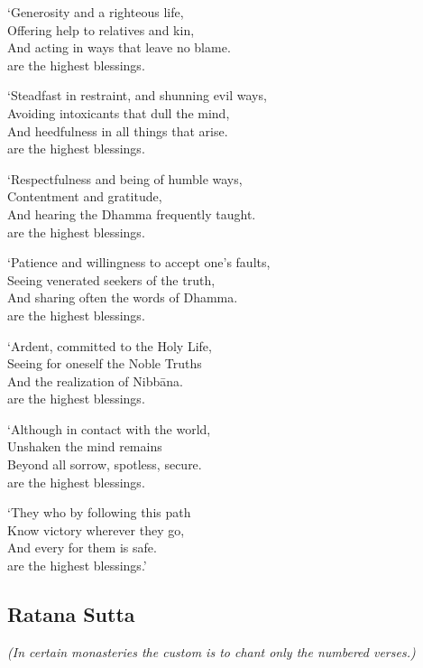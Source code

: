 `Generosity and a righteous life,\\
Offering help to relatives and kin,\\
And acting in ways that leave no blame.\\
 are the highest blessings.

`Steadfast in restraint, and shunning evil ways,\\
Avoiding intoxicants that dull the mind,\\
And heedfulness in all things that arise.\\
 are the highest blessings.

`Respectfulness and being of humble ways,\\
Contentment and gratitude,\\
And hearing the Dhamma frequently taught.\\
 are the highest blessings.

`Patience and willingness to accept one's faults,\\
Seeing venerated seekers of the truth,\\
And sharing often the words of Dhamma.\\
 are the highest blessings.

`Ardent, committed to the Holy Life,\\%
Seeing for oneself the Noble Truths\\
And the realization of Nibbāna.\\
 are the highest blessings.

`Although in contact with the world,\\
Unshaken the mind remains\\
Beyond all sorrow, spotless, secure.\\
 are the highest blessings.

`They who  by following this path\\
Know victory wherever they go,\\
And every  for them is safe.\\
 are the highest blessings.'

\subsection{Ratana Sutta}


\emph{(In certain monasteries the custom is to chant only the numbered verses.)}

